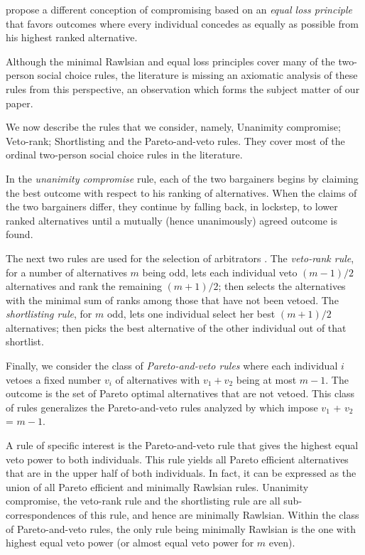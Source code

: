 \documentclass[pagesize, twoside=off, bibliography=totoc, DIV=calc, fontsize=12pt, a4paper]{scrartcl}
\begin{document}
 propose a different conception of compromising based on an \textit{equal loss principle} that favors outcomes where every individual concedes as equally as possible from his highest ranked alternative.

Although the minimal Rawlsian and equal loss principles cover many of the two-person social choice rules, the literature is missing an axiomatic analysis of these rules from this perspective, an observation which forms the subject matter of our paper.

We now describe the rules that we consider, namely, Unanimity compromise; Veto-rank; Shortlisting and the Pareto-and-veto rules.
They cover most of the ordinal two-person social choice rules in the literature.

In the \textit{unanimity compromise} \citep{BramsKilgour2001} rule, each of the two bargainers begins by claiming the best outcome with respect to his ranking of alternatives. When the claims of the two bargainers differ, they continue by falling back, in lockstep, to lower ranked alternatives until a mutually (hence unanimously) agreed outcome is found.

The next two rules are used for the selection of arbitrators \citep{Clippel}.
The \textit{veto-rank rule}, for a number of alternatives $m$ being odd, lets each individual veto $(m - 1) / 2$ alternatives and rank the remaining $(m+1) / 2$; then selects the alternatives with the minimal sum of ranks among those that have not been vetoed.
The \textit{shortlisting rule}, for $m$ odd, lets one individual select her best $(m+1) / 2$ alternatives; then picks the best alternative of the other individual out of that shortlist.

Finally, we consider the class of \textit{Pareto-and-veto rules} where each individual $i$ vetoes a fixed number $v_i$ of alternatives with $v_1 + v_2$ being at most $m - 1$. The outcome is the set of Pareto optimal alternatives that are not vetoed.
This class of rules generalizes the Pareto-and-veto rules analyzed by \citet{laslier2021solution} which impose $v_1$ + $v_2$ = $m-1$.

A rule of specific interest is the Pareto-and-veto rule that gives the highest equal veto power to both individuals. This rule yields all Pareto efficient alternatives that are in the upper half of both individuals. In fact, it can be expressed as the union of all Pareto efficient and minimally Rawlsian rules. Unanimity compromise, the veto-rank rule and the shortlisting rule are all sub-correspondences of this rule, and hence are minimally Rawlsian. Within the class of Pareto-and-veto rules, the only rule being minimally Rawlsian is the one with highest equal veto power (or almost equal veto power for $m$ even).
\end{document}
